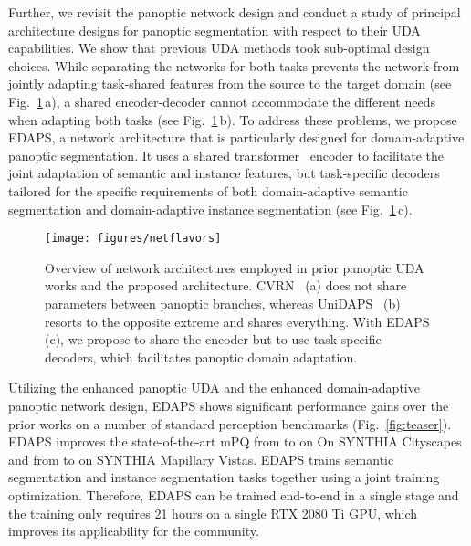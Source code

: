 \documentclass[10pt,twocolumn,letterpaper]{article}
\begin{document}
Further, we revisit the panoptic network design and conduct a study of principal architecture designs for panoptic segmentation with respect to their UDA capabilities. We show that previous UDA methods took sub-optimal design choices. While separating the networks for both tasks prevents the network from jointly adapting task-shared features from the source to the target domain (see Fig.~\ref{fig:architecture_comparison}\,a), a shared encoder-decoder cannot accommodate the different needs when adapting both tasks (see Fig.~\ref{fig:architecture_comparison}\,b). 
To address these problems, we propose EDAPS, a network architecture that is particularly designed for domain-adaptive panoptic segmentation. It uses a shared transformer~\cite{vaswani2017attention} encoder to facilitate the joint adaptation of semantic and instance features, but task-specific decoders tailored for the specific requirements of 
both domain-adaptive semantic segmentation and domain-adaptive instance segmentation (see Fig.~\ref{fig:architecture_comparison}\,c).


\begin{figure}[t]
  \centering
  \texttt{[image: figures/netflavors]}
  \caption{
    Overview of network architectures employed in prior panoptic UDA works and the proposed architecture. CVRN~\cite{huang2021cross} 
    (a) does not share parameters between panoptic branches, whereas UniDAPS~\cite{zhang2022hierarchical} 
    (b) resorts to the opposite extreme and shares everything. 
    With EDAPS (c), we propose to share the encoder but to use task-specific decoders, which facilitates panoptic domain adaptation.
  }
  \label{fig:architecture_comparison}
\end{figure}

Utilizing the enhanced panoptic UDA and the enhanced domain-adaptive panoptic network design, EDAPS shows significant performance gains over the prior works on a number of standard perception benchmarks (Fig.~\ref{fig:teaser}).
EDAPS improves the state-of-the-art mPQ from  to  on On SYNTHIA  Cityscapes and from  to  on SYNTHIA  Mapillary Vistas. 
EDAPS trains semantic segmentation and instance segmentation tasks together using a joint training optimization. Therefore, EDAPS can be trained end-to-end in a single stage and the training only requires 21 hours on a single RTX 2080 Ti GPU, which improves its applicability for the community.
\end{document}
